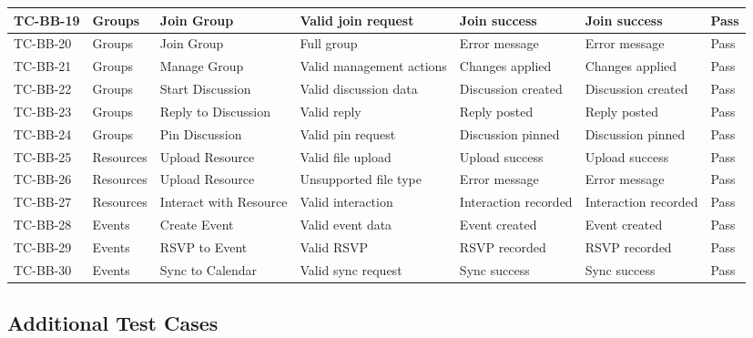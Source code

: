 {\begin{longtable}{|p{1.5cm}|p{2.2cm}|p{2.5cm}|p{2.5cm}|p{2.5cm}|p{2.5cm}|p{1.5cm}|}
\hline
TC-BB-19 & Groups & Join Group & Valid join request & Join success & Join success & Pass \\
\hline
TC-BB-20 & Groups & Join Group & Full group & Error message & Error message & Pass \\
\hline
TC-BB-21 & Groups & Manage Group & Valid management actions & Changes applied & Changes applied & Pass \\
\hline
TC-BB-22 & Groups & Start Discussion & Valid discussion data & Discussion created & Discussion created & Pass \\
\hline
TC-BB-23 & Groups & Reply to Discussion & Valid reply & Reply posted & Reply posted & Pass \\
\hline
TC-BB-24 & Groups & Pin Discussion & Valid pin request & Discussion pinned & Discussion pinned & Pass \\
\hline
TC-BB-25 & Resources & Upload Resource & Valid file upload & Upload success & Upload success & Pass \\
\hline
TC-BB-26 & Resources & Upload Resource & Unsupported file type & Error message & Error message & Pass \\
\hline
TC-BB-27 & Resources & Interact with Resource & Valid interaction & Interaction recorded & Interaction recorded & Pass \\
\hline
TC-BB-28 & Events & Create Event & Valid event data & Event created & Event created & Pass \\
\hline
TC-BB-29 & Events & RSVP to Event & Valid RSVP & RSVP recorded & RSVP recorded & Pass \\
\hline
TC-BB-30 & Events & Sync to Calendar & Valid sync request & Sync success & Sync success & Pass \\
\hline
\end{longtable}
}

\subsection{Additional Test Cases}

